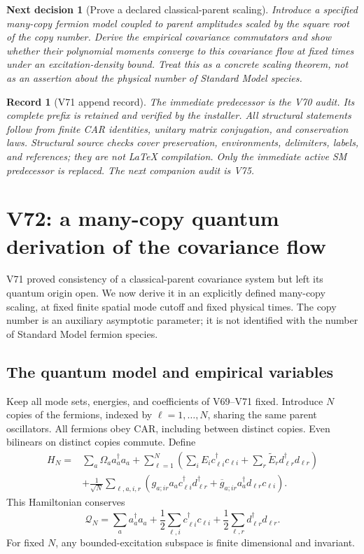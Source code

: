 \documentclass[11pt]{article}
\newtheorem{decision}[theorem]{Next decision}
\newtheorem{record}[theorem]{Record}
\theoremstyle{remark}
\begin{document}
\begin{decision}[Prove a declared classical-parent scaling]
\label{dec:v20v71-next}
Introduce a specified many-copy fermion model
coupled to parent amplitudes scaled by the square
root of the copy number.  Derive the empirical
covariance commutators and show whether their
polynomial moments converge to this covariance
flow at fixed times under an excitation-density
bound.  Treat this as a concrete scaling theorem,
not as an assertion about the physical number
of Standard Model species.
\end{decision}

\begin{record}[V71 append record]
\label{rec:v20v71}
The immediate predecessor is the V70 audit.
Its complete prefix is retained and verified
by the installer.  All structural statements
follow from finite CAR identities, unitary
matrix conjugation, and conservation laws.
Structural source checks cover preservation,
environments, delimiters, labels, and references;
they are not LaTeX compilation.
Only the immediate active SM predecessor is
replaced.  The next companion audit is V75.
\end{record}


\section{V72: a many-copy quantum derivation of the covariance flow}
\label{sec:v20v72}

V71 proved consistency of a classical-parent covariance
system but left its quantum origin open.  We now derive it
in an explicitly defined many-copy scaling, at fixed
finite spatial mode cutoff and fixed physical times.
The copy number is an auxiliary asymptotic parameter;
it is not identified with the number of Standard Model
fermion species.

\subsection{The quantum model and empirical variables}

Keep all mode sets, energies, and coefficients of V69--V71
fixed.  Introduce \(N\) copies of the fermions, indexed by
\(\ell=1,\ldots,N\), sharing the same parent oscillators.
All fermions obey CAR, including between distinct copies.
Even bilinears on distinct copies commute.  Define
\[
 \begin{split}
 H_N={}&\sum_a\Omega_a a_a^\dagger a_a+
  \sum_{\ell=1}^N\left(\sum_iE_i c_{\ell i}^\dagger c_{\ell i}
           +\sum_r\widetilde E_r d_{\ell r}^\dagger d_{\ell r}\right)\\
 &+\frac1{\sqrt N}\sum_{\ell,a,i,r}
       (g_{a;ir}a_ac_{\ell i}^\dagger d_{\ell r}^\dagger+
        \overline g_{a;ir}a_a^\dagger d_{\ell r}c_{\ell i}).
 \end{split}
\]
This Hamiltonian conserves
\[
 \mathcal Q_N=\sum_a a_a^\dagger a_a+
       \frac12\sum_{\ell,i}c_{\ell i}^\dagger c_{\ell i}
       +\frac12\sum_{\ell,r}d_{\ell r}^\dagger d_{\ell r}.
\]
For fixed \(N\), any bounded-excitation subspace is
finite dimensional and invariant.
\end{document}
